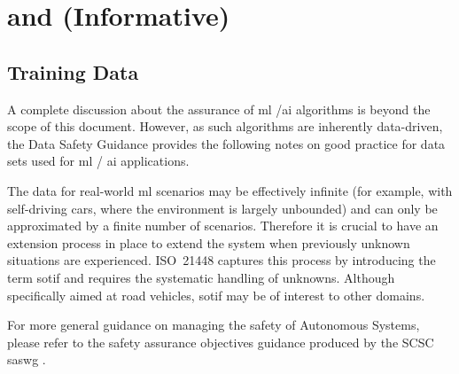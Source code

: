 %
%
\section{ and  (Informative)} \label{bkm:MachineLearning}



\subsection{ Training Data}
A complete discussion about the assurance of \gls{ml} /\gls{ai} algorithms is beyond the scope of this document.
However, as such algorithms are inherently data-driven, the Data Safety Guidance provides the following notes on good practice for data sets used for \gls{ml} / \gls{ai} applications.

The data for real-world \gls{ml} scenarios may be effectively infinite (for example, with self-driving cars, where the environment is largely unbounded) and can only be approximated by a finite number of scenarios.
Therefore it is crucial to have an extension process in place to extend the system when previously unknown situations are experienced. 
ISO~21448 \cite{citation:ISO21448} captures this process by introducing the term \gls{sotif} and requires the systematic handling of unknowns. Although specifically aimed at road vehicles, \gls{sotif} may be of interest to other domains.

For more general guidance on managing the safety of Autonomous Systems, please refer to the safety assurance objectives guidance produced by the SCSC \gls{saswg} \cite{citation:SASWG:Objectives}.

